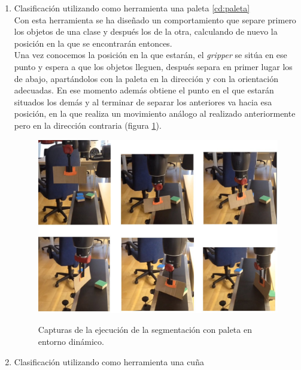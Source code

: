 \begin{enumerate}
	\item Clasificación utilizando como herramienta una paleta \ref{cd:paleta}\\
	
	Con esta herramienta se ha diseñado un comportamiento que separe primero los objetos de una clase y después los de la otra, calculando de nuevo la posición en la que se encontrarán entonces. \\ 
	Una vez conocemos la posición en la que estarán, el \textit{gripper} se sitúa en ese punto y espera a que los objetos lleguen, después separa en primer lugar los de abajo, apartándolos con la paleta en la dirección y con la orientación adecuadas. En ese momento además obtiene el punto en el que estarán situados los demás y al terminar de separar los anteriores va hacia esa posición, en la que realiza un movimiento análogo al realizado anteriormente pero en la dirección contraria (figura \ref{cd:pd}). \\
	
	\begin{figure}[H]
		\centering %
		\label{cd:pd}
		\includegraphics[scale=0.21]{imagenes/paletadyn.jpg}
		\caption{Capturas de la ejecución de la segmentación con paleta en entorno dinámico.}
	\end{figure}
	
	\item Clasificación utilizando como herramienta una cuña \\
	

\end{enumerate}
